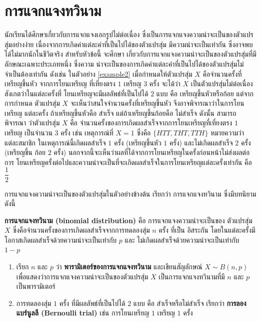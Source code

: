 \newpage
\section{การแจกแจงทวินาม}
นักเรียนได้ศึกษาเกี่ยวกับการแจกแจงเอกรูปไม่ต่อเนื่อง ซึ่งเป็นการแจกแจงความน่าจะเป็นของตัวแปรสุ่มอย่างง่าย เนื่องจากการเกิดค่าแต่ละค่าที่เป็นไปได้ของตัวแปรสุ่ม มีความน่าจะเป็นเท่ากัน ซึ่งอาจพบได้ไม่มากนักในชีวิตจริง สำหรับหัวข้อนี้ จะศึกษา เกี่ยวกับการแจกแจงความน่าจะเป็นของตัวแปรสุ่มที่มีลักษณะเฉพาะประเภทหนึ่ง ซึ่งความ น่าจะเป็นของการเกิดค่าแต่ละค่าที่เป็นไปได้ของตัวแปรสุ่มไม่จำเป็นต้องเท่ากัน ดังเช่น ในตัวอย่าง \ref{example2} เมื่อกำหนดให้ตัวแปรสุ่ม $X$ คือจำนวนครั้งที่เหรียญขึ้นหัว จากการโยนเหรียญ ที่เที่ยงตรง $1$ เหรียญ $3$ ครั้ง จะได้ว่า $X$ เป็นตัวแปรสุ่มไม่ต่อเนื่อง สังเกตว่าในแต่ละครั้งที่ โยนเหรียญจะมีผลลัพธ์ที่เป็นไปได้ $2$ แบบ คือ เหรียญขึ้นหัวหรือก้อย แต่จากการกำหนด ตัวแปรสุ่ม $X$ จะเห็นว่าสนใจจำนวนครั้งที่เหรียญขึ้นหัว จึงอาจพิจารณาว่าในการโยนเหรียญ แต่ละครั้ง ถ้าเหรียญขึ้นหัวคือ สำเร็จ แต่ถ้าเหรียญขึ้นก้อยคือ ไม่สำเร็จ ดังนั้น สามารถพิจารณา ว่าตัวแปรสุ่ม $X$ คือ จำนวนครั้งของการเกิดผลสำเร็จจากการโยนเหรียญที่เที่ยงตรง $1$ เหรียญ เป็นจำนวน $3$ ครั้ง เช่น เหตุการณ์ที่ $X=1$ ซึ่งคือ $\{HTT, THT, TTH\}$ หมายความว่า แต่ละสมาชิก ในเหตุการณ์นี้เกิดผลสำเร็จ $1$ ครั้ง (เหรียญขึ้นหัว $1$ ครั้ง) และไม่เกิดผลสำเร็จ $2$ ครั้ง (เหรียญขึ้น ก้อย $2$ ครั้ง) นอกจากนี้จะเห็นว่าผลที่ได้จากการโยนเหรียญในครั้งก่อนหน้าไม่ส่งผลต่อการ โยนเหรียญครั้งต่อไปและความน่าจะเป็นที่จะเกิดผลสำเร็จในการโยนเหรียญแต่ละครั้งเท่ากัน คือ $\dfrac{1}{2}$

การแจกแจงความน่าจะเป็นของตัวแปรสุ่มในตัวอย่างข้างต้น เรียกว่า การแจกแจงทวินาม ซึ่งมีบทนิยามดังนี้
\begin{definitionbox}
	\textbf{การแจกแจงทวินาม (binomial distribution)} คือ การแจกแจงความน่าจะเป็นของ ตัวแปรสุ่ม $X$ ซึ่งคือจำนวนครั้งของการเกิดผลสำเร็จจากการทดลองสุ่ม $n$ ครั้ง ที่เป็น อิสระกัน โดยในแต่ละครั้งมีโอกาสเกิดผลสำเร็จด้วยความน่าจะเป็นเท่ากับ $p$ และ ไม่เกิดผลสำเร็จด้วยความน่าจะเป็นเท่ากับ $1-p$
\end{definitionbox}
\remark 
\begin{enumerate}
	\item เรียก $n$ และ $p$ ว่า \textbf{พารามิเตอร์ของการแจกแจงทวินาม} และเขียนสัญลักษณ์ $X \sim B(n, p)$ เพื่อแสดงว่าการแจกแจงความน่าจะเป็นของตัวแปรสุ่ม $X$ เป็นการแจกแจงทวินามที่มี $n$ และ $p$ เป็นพารามิเตอร์
	\item การทดลองสุ่ม $1$ ครั้ง ที่มีผลลัพธ์ที่เป็นไปได้ $2$ แบบ คือ สำเร็จหรือไม่สำเร็จ เรียกว่า \textbf{การลองแบร์นูลลี (Bernoulli trial)} เช่น การโยนเหรียญ $1$ เหรียญ $1$ ครั้ง
\end{enumerate}

